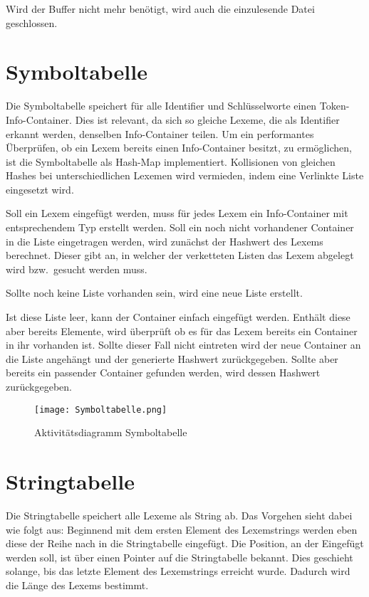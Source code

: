 Wird der Buffer nicht mehr benötigt, wird auch die einzulesende Datei geschlossen.

\section{Symboltabelle}
Die Symboltabelle speichert für alle Identifier und Schlüsselworte einen Token-Info-Container. Dies ist relevant, da sich so gleiche Lexeme, die als Identifier erkannt werden, denselben Info-Container teilen. Um ein performantes Überprüfen, ob ein Lexem bereits einen Info-Container besitzt, zu ermöglichen, ist die Symboltabelle als Hash-Map implementiert. Kollisionen von gleichen Hashes bei unterschiedlichen Lexemen wird vermieden, indem eine Verlinkte Liste eingesetzt wird.

Soll ein Lexem eingefügt werden, muss für jedes Lexem ein Info-Container mit entsprechendem Typ erstellt werden.
Soll ein noch nicht vorhandener Container in die Liste eingetragen werden, wird zunächst der Hashwert des Lexems berechnet. Dieser gibt an, in welcher der verketteten Listen das Lexem abgelegt wird bzw.~gesucht werden muss.

Sollte noch keine Liste vorhanden sein, wird eine neue Liste erstellt.

Ist diese Liste leer, kann der Container einfach eingefügt werden. Enthält diese aber bereits Elemente, wird überprüft ob es für das Lexem bereits ein Container in ihr vorhanden ist. Sollte dieser Fall nicht eintreten wird der neue Container an die Liste angehängt und der generierte Hashwert zurückgegeben. Sollte aber bereits ein passender Container gefunden werden, wird dessen Hashwert zurückgegeben.

\begin{figure}[!htb]
    \centering
      \texttt{[image: Symboltabelle.png]}
    \caption{Aktivitätsdiagramm Symboltabelle}\label{fig:symboltabelle}
\end{figure}

\section{Stringtabelle}
Die Stringtabelle speichert alle Lexeme als String ab.
Das Vorgehen sieht dabei wie folgt aus: Beginnend mit dem ersten Element des Lexemstrings werden eben diese der Reihe nach in die Stringtabelle eingefügt. Die Position, an der Eingefügt werden soll,  ist über einen Pointer auf die Stringtabelle bekannt. Dies geschieht solange, bis das letzte Element des Lexemstrings erreicht wurde. Dadurch wird die Länge des Lexems bestimmt.

